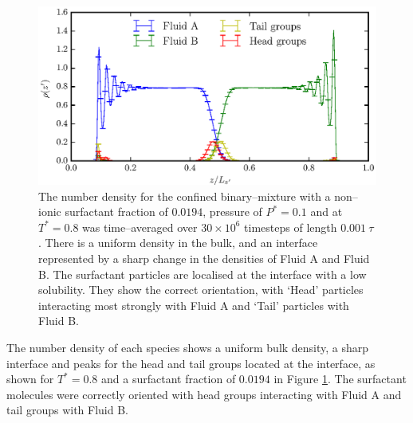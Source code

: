\begin{figure}[h!]
\centering
\includegraphics[scale=1.0]{SurfRho}
\caption{The number density for the confined binary--mixture with a non--ionic surfactant fraction of $0.0194$, pressure of $P^{*}=0.1$ and at $T^{*}=0.8$ was time--averaged over $30 \times 10^{6}$ timesteps of length $0.001\ \tau$. 
There is a uniform density in the bulk, and an interface represented by a sharp change in the densities of Fluid A and Fluid B.
The surfactant particles are localised at the interface with a low solubility.
They show the correct orientation, with `Head' particles interacting most strongly with Fluid A and `Tail' particles with Fluid B.
}
\label{SurfRho}
\end{figure}

The number density of each species shows a uniform bulk density, a sharp interface and peaks for the head and tail groups located at the interface, as shown for $T^{*}=0.8$ and a surfactant fraction of $0.0194$ in Figure \ref{SurfRho}.
The surfactant molecules were correctly oriented with head groups interacting with Fluid A and tail groups with Fluid B.
\FloatBarrier

